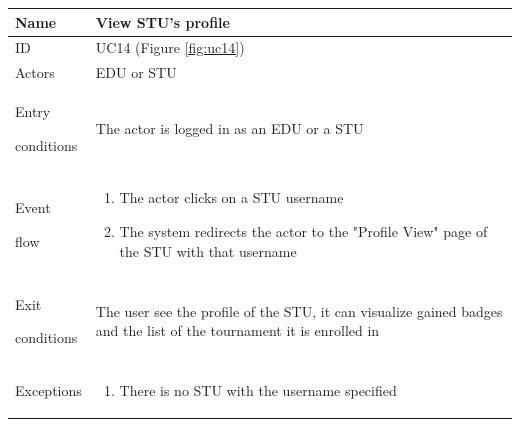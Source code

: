 \begin{center}
    \def\arraystretch{1.5}
    \begin{tabular}{| m{2cm} | m{10cm}|}
        \hline
        Name                  & View STU's profile                                                                                                      \\ \hline
        ID                    & UC14 (Figure \ref{fig:uc14})                                                                                            \\ \hline
        Actors                & EDU or STU                                                                                                              \\ \hline
        Entry \par conditions & The actor is logged in as an EDU or a STU                                                                               \\ \hline
        Event \par flow       & \begin{enumerate}
                                    \item The actor clicks on a STU username
                                    \item The system redirects the actor to the "Profile View" page of the STU with that username
                                \end{enumerate}                                                                                                         \\ \hline
        Exit \par conditions  & The user see the profile of the STU, it can visualize gained badges and the list of the tournament it is enrolled in        \\ \hline
        Exceptions            & \begin{enumerate}
                                    \item There is no STU with the username specified
                                \end{enumerate}                                                                                                         \\ \hline
    \end{tabular}
\end{center}


